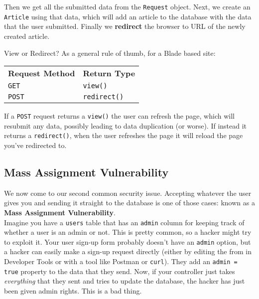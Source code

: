 Then we get all the submitted data from the \texttt{Request} object. Next, we create an \texttt{Article} using that data, which will add an article to the database with the data that the user submitted. Finally we \textbf{redirect} the browser to URL of the newly created article.

\begin{infobox}{View or Redirect?}
    As a general rule of thumb, for a Blade based site:
    \\

    \begin{tabularx}{\textwidth}{l X}
        \textbf{Request Method}  & \textbf{Return Type} \\
        \texttt{GET}             & \texttt{view()} \\
        \texttt{POST}            & \texttt{redirect()} \\
    \end{tabularx}

    \par\bigskip

    If a \texttt{POST} request returns a \texttt{view()} the user can refresh the page, which will resubmit any data, possibly leading to data duplication (or worse). If instead it returns a \texttt{redirect()}, when the user refreshes the page it will reload the page you've redirected to.
\end{infobox}


\subsection{Mass Assignment Vulnerability}

We now come to our second common security issue. Accepting whatever the user gives you and sending it straight to the database is one of those cases: known as a \textbf{Mass Assignment Vulnerability}.
\\

Imagine you have a \texttt{users} table that has an \texttt{admin} column for keeping track of whether a user is an admin or not. This is pretty common, so a hacker might try to exploit it. Your user sign-up form probably doesn't have an \texttt{admin} option, but a hacker can easily make a sign-up request directly (either by editing the from in Developer Tools or with a tool like Postman or \texttt{curl}). They add an \texttt{admin = true} property to the data that they send. Now, if your controller just takes \textit{everything} that they sent and tries to update the database, the hacker has just been given admin rights. This is a bad thing.
\\

